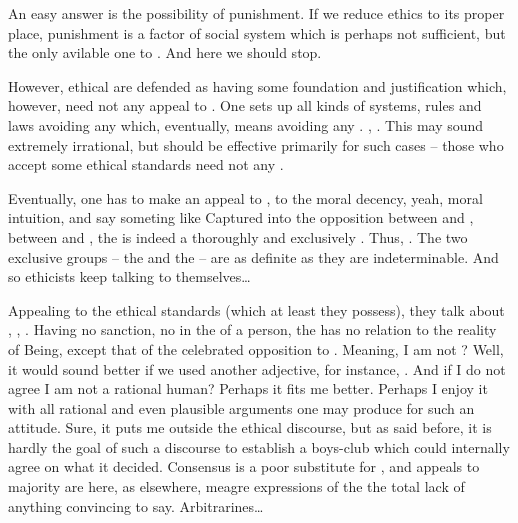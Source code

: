 {{\pa
An easy answer is the possibility of punishment. If we reduce ethics 
to its proper place, punishment is a factor of social system which is 
perhaps not sufficient, but the only avilable one to . And 
here we should stop.

However, ethical  are defended as having some
foundation and justification which, however, need not any appeal to
.  One sets up all kinds of systems, rules and laws
avoiding any  which, eventually, means
avoiding any .  , .  This may
sound extremely irrational, but  should be effective
primarily for such cases -- those who accept some ethical standards
need not any .

\pa Eventually, one has to make an appeal to , to the
moral decency, yeah, moral intuition, and say someting like  Captured into the  opposition
between  and , between  
and , the  is
indeed a thoroughly and exclusively .  Thus,
.  The two
exclusive groups -- the  and the  -- are
as definite as they are indeterminable.  And so ethicists keep talking
to themselves\ldots 

\pa Appealing to the ethical standards (which at least they possess),
they talk about , , . 
Having no sanction, no  in the
 of a person, the  has no relation to the
reality of Being, except that of the celebrated opposition to
.   Meaning, I am
not ?  Well, it would sound better if we used another
adjective, for instance, .   And
if I do not agree I am not a rational human?  Perhaps it fits me
better.  Perhaps I enjoy it with all rational and even plausible
arguments one may produce for such an attitude.  Sure, it puts me
outside the ethical discourse, but as said before, it is hardly the
goal of such a discourse to establish a boys-club which could
internally agree on what it decided.  Consensus is a poor substitute
for , and appeals to majority are here,
as elsewhere, meagre expressions of the the total lack of anything
convincing to say.  Arbitrarines\ldots

}}
